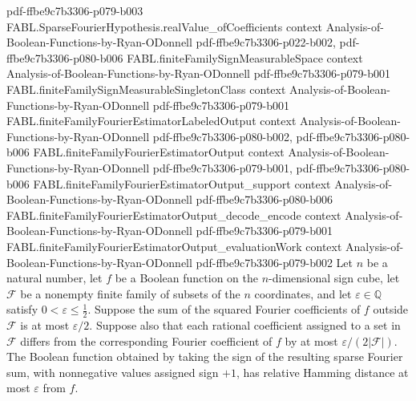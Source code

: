 \begin{theorem}
{    pdf-ffbe9c7b3306-p079-b003}
\proofstep
  {FABL.SparseFourierHypothesis.realValue_ofCoefficients}
  {context}
  {Analysis-of-Boolean-Functions-by-Ryan-ODonnell}
  {pdf-ffbe9c7b3306-p022-b002,
    pdf-ffbe9c7b3306-p080-b006}
\proofstep
  {FABL.finiteFamilySignMeasurableSpace}
  {context}
  {Analysis-of-Boolean-Functions-by-Ryan-ODonnell}
  {pdf-ffbe9c7b3306-p079-b001}
\proofstep
  {FABL.finiteFamilySignMeasurableSingletonClass}
  {context}
  {Analysis-of-Boolean-Functions-by-Ryan-ODonnell}
  {pdf-ffbe9c7b3306-p079-b001}
\proofstep
  {FABL.finiteFamilyFourierEstimatorLabeledOutput}
  {context}
  {Analysis-of-Boolean-Functions-by-Ryan-ODonnell}
  {pdf-ffbe9c7b3306-p080-b002,
    pdf-ffbe9c7b3306-p080-b006}
\proofstep
  {FABL.finiteFamilyFourierEstimatorOutput}
  {context}
  {Analysis-of-Boolean-Functions-by-Ryan-ODonnell}
  {pdf-ffbe9c7b3306-p079-b001,
    pdf-ffbe9c7b3306-p080-b006}
\proofstep
  {FABL.finiteFamilyFourierEstimatorOutput_support}
  {context}
  {Analysis-of-Boolean-Functions-by-Ryan-ODonnell}
  {pdf-ffbe9c7b3306-p080-b006}
\proofstep
  {FABL.finiteFamilyFourierEstimatorOutput_decode_encode}
  {context}
  {Analysis-of-Boolean-Functions-by-Ryan-ODonnell}
  {pdf-ffbe9c7b3306-p079-b001}
\proofstep
  {FABL.finiteFamilyFourierEstimatorOutput_evaluationWork}
  {context}
  {Analysis-of-Boolean-Functions-by-Ryan-ODonnell}
  {pdf-ffbe9c7b3306-p079-b002}
Let $n$ be a natural number, let $f$ be a Boolean function on the $n$-dimensional sign
cube, let $\mathcal{F}$ be a nonempty finite family of subsets of the $n$ coordinates,
and let $\varepsilon\in\mathbb{Q}$ satisfy $0<\varepsilon\leq\frac12$. Suppose the sum
of the squared Fourier coefficients of $f$ outside $\mathcal{F}$ is at most
$\varepsilon/2$. Suppose also that each rational coefficient assigned to a set in
$\mathcal{F}$ differs from the corresponding Fourier coefficient of $f$ by at most
$\varepsilon/(2|\mathcal{F}|)$. The Boolean function obtained by taking the sign of the
resulting sparse Fourier sum, with nonnegative values assigned sign $+1$, has relative
Hamming distance at most $\varepsilon$ from $f$.
\end{theorem}

